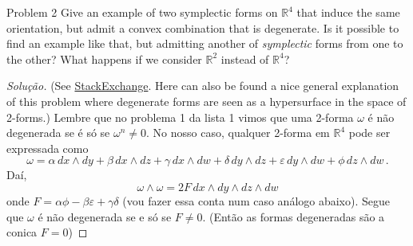 \begin{idea8}{Problem 2}\leavevmode
	Give an example of two symplectic forms on $\mathbb{R}^{4}$ that induce the same orientation, but admit a convex combination that is degenerate. Is it possible to find an example like that, but admitting another of \textit{symplectic} forms from one to the other? What happens if we consider $\mathbb{R}^{2}$ instead of $\mathbb{R}^{4}$?
\end{idea8}

\begin{proof}[Solução]\leavevmode
	{\color{2} (See \href{https://math.stackexchange.com/questions/2864834/non-linear-path-between-symplectic-forms-in-mathbbr4}{StackExchange}. Here can also be found a nice general explanation of this problem where degenerate forms are seen as a hypersurface in the space of 2-forms.)}\hspace{.5em} Lembre que no problema 1 da lista 1 vimos que uma 2-forma $\omega$ é não degenerada se é só se $\omega^n\neq 0$. No nosso caso, qualquer 2-forma em $\mathbb{R}^{4}$ pode ser expressada como
	\[\omega = \alpha \, dx \wedge dy + \beta \, dx \wedge dz + \gamma \, dx \wedge dw + \delta \, dy \wedge dz + \varepsilon \, dy \wedge dw + \phi \, dz \wedge dw \, .\]
	Daí,
	\[\omega \wedge \omega =2 F \, dx \wedge dy \wedge dz \wedge dw\]
	onde $F = \alpha \phi - \beta \varepsilon + \gamma \delta$ (vou fazer essa conta num caso análogo abaixo). Segue que $\omega$ é não degenerada se e só se $F\neq 0$. (Então as formas degeneradas são a conica $F=0$)


\end{proof}
